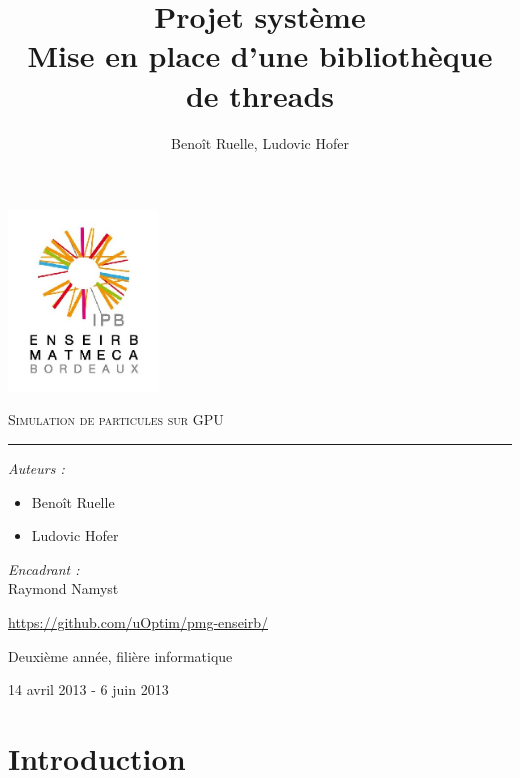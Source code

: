 \documentclass{article}
\title{Projet système \\ Mise en place d'une bibliothèque de threads}
\author{Benoît Ruelle, Ludovic Hofer}
\begin{document}
\begin{center}
  \includegraphics [width=40mm]{ENSEIRB-MATMECA.jpg} 


\textsc{\Huge Simulation de particules sur GPU}\\[0.5cm]
\rule{0.4\textwidth}{1pt}


\begin{center}
  
  \begin{flushleft}
    \large
    \emph{Auteurs :}\\
    \begin{itemize}
    \item Benoît Ruelle
    \item Ludovic Hofer
    \end{itemize}
  \end{flushleft}
  
  
  \begin{flushright}
    \large
    \emph{Encadrant :}\\
    Raymond Namyst
  \end{flushright}
\end{center}


{\large \url{https://github.com/uOptim/pmg-enseirb/}}


{\large Deuxième année, filière informatique} 
~

{\large 14 avril 2013 - 6 juin 2013}\\

\end{center}
\thispagestyle{empty}
\pagebreak
\tableofcontents
\listoffigures
\newpage

\section{Introduction}
\end{document}
